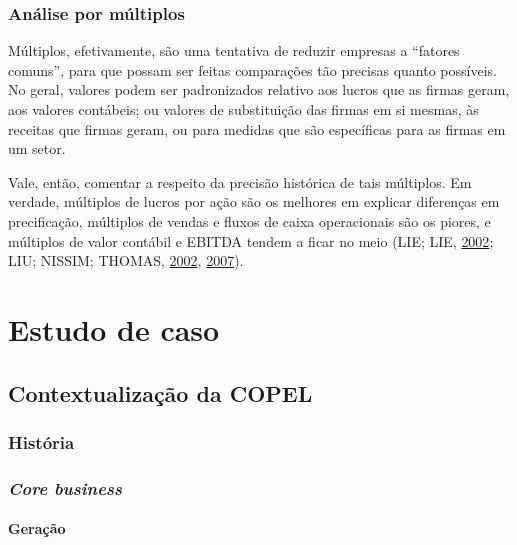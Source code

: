 \documentclass[grad,numbers]{coppe}
\begin{document}
  \hypertarget{anuxe1lise-por-muxfaltiplos}{%
  \subsection{Análise por múltiplos}\label{anuxe1lise-por-muxfaltiplos}}

  Múltiplos, efetivamente, são uma tentativa de reduzir empresas a ``fatores comuns'', para que possam ser feitas comparações tão precisas quanto possíveis. No geral, valores podem ser padronizados relativo aos lucros que as firmas geram, aos valores contábeis; ou valores de substituição das firmas em si mesmas, às receitas que firmas geram, ou para medidas que são específicas para as firmas em um setor.

  Vale, então, comentar a respeito da precisão histórica de tais múltiplos. Em verdade, múltiplos de lucros por ação são os melhores em explicar diferenças em precificação, múltiplos de vendas e fluxos de caixa operacionais são os piores, e múltiplos de valor contábil e EBITDA tendem a ficar no meio (LIE; LIE, \protect\hyperlink{ref-lie2002}{2002}; LIU; NISSIM; THOMAS, \protect\hyperlink{ref-liu2002}{2002}, \protect\hyperlink{ref-liu2007}{2007}).

  \hypertarget{estudo-de-caso}{%
  \chapter{Estudo de caso}\label{estudo-de-caso}}

  \hypertarget{contextualizauxe7uxe3o-da-copel}{%
  \section{Contextualização da COPEL}\label{contextualizauxe7uxe3o-da-copel}}

  \hypertarget{histuxf3ria}{%
  \subsection{História}\label{histuxf3ria}}

  \hypertarget{core-business}{%
  \subsection{\texorpdfstring{\emph{Core business}}{Core business}}\label{core-business}}

  \hypertarget{gerauxe7uxe3o}{%
  \subsubsection{Geração}\label{gerauxe7uxe3o}}
\end{document}
